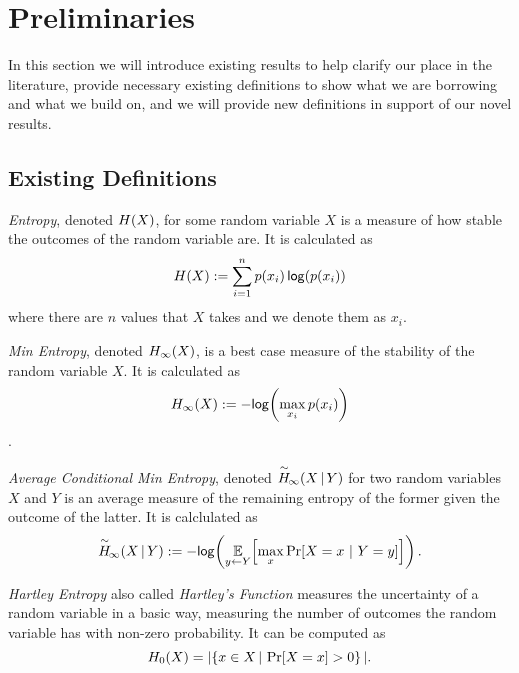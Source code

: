 
\section{Preliminaries}
In this section we will introduce existing results to help clarify our place in the literature, provide necessary existing definitions to show what we are borrowing and what we build on, and we will provide new definitions in support of our novel results.

\subsection{Existing Definitions}

\begin{definition}[Entropy]
    \emph{Entropy}, denoted $H\!\left(X\right)$, for some random variable $X$ is a measure of how stable the outcomes of the random variable are. It is calculated as \[H\!\left(X\right) := \sum\limits_{i=1}^n p\!\left(x_i\right)\mathsf{log}\!\left(p\!\left(x_i\right)\right)\] where there are $n$ values that $X$ takes and we denote them as $x_i$. 
\end{definition}

\begin{definition}
    \emph{Min Entropy}, denoted $H_{\infty}\!\left(X\right)$, is a best case measure of the stability of the random variable $X$. It is calculated as \[H_{\infty}\!\left(X\right) := -\mathsf{log}\!\left(\max\limits_{x_i} p(x_i)\right)\].  
\end{definition}

\begin{definition}
    \emph{Average Conditional Min Entropy}, denoted $\overset{\sim}{H}\!_{\infty}\!\left(X\,|\,Y\right)$ for two random variables $X$ and $Y$ is an average measure of the remaining entropy of the former given the outcome of the latter. It is calclulated as \[ \overset{\sim}{H}\!_{\infty}\!\left(X\,|\,Y\right) := -\mathsf{log}\!\left(\operatorname*{\mathbb{E}}\limits_{y \leftarrow Y}\!\left[\max\limits_{x} \Pr\!\left[X = x\ |\ Y = y\right]\right]\right).\] 
\end{definition}

\begin{definition}
    \emph{Hartley Entropy} also called \emph{Hartley's Function} measures the uncertainty of a random variable in a basic way, measuring the number of outcomes the random variable has with non-zero probability. It can be computed as 
    \[
    H_0\!\left(X\right) = | \!\left\{ x \in X\,|\, \Pr\!\left[X = x\right] > 0 \right\}|.
    \]
\end{definition}

